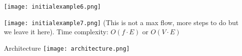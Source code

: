 \documentclass{beamer}
\begin{document}
\begin{frame}
    \centering
    \texttt{[image: initialexample6.png]}
\end{frame}

\begin{frame}
    \centering
    \texttt{[image: initialexample7.png]}
    \tiny (This is not a max flow, more steps to do but we leave it here). Time complexity: $O(f \cdot E)$ or $O(V \cdot E)$
\end{frame}


\begin{frame}{Architecture}
    \centering
    \texttt{[image: architecture.png]}
    
\end{frame}
\end{document}
